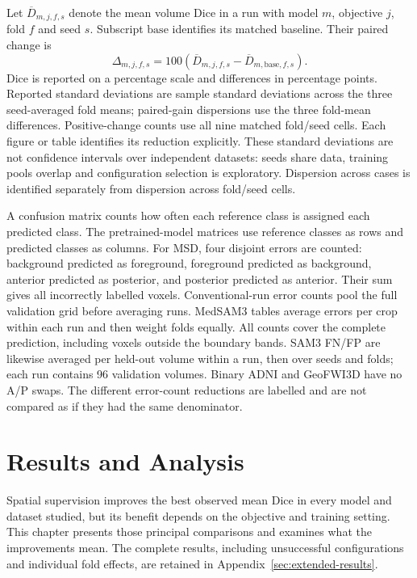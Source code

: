 \documentclass[12pt,a4paper]{article}
\begin{document}
Let $\overline D_{m,j,f,s}$ denote the mean volume Dice in a run with
model $m$, objective $j$, fold $f$ and seed $s$. Subscript
$\mathrm{base}$ identifies its matched baseline. Their paired change is
\begin{equation}
 \Delta_{m,j,f,s}=100\left(
 \overline D_{m,j,f,s}-\overline D_{m,\mathrm{base},f,s}\right).
\label{eq:paired-reported-gain}
\end{equation}
Dice is reported on a percentage scale and differences in percentage
points. Reported standard deviations are sample standard deviations across
the three seed-averaged fold means; paired-gain dispersions use the three
fold-mean differences. Positive-change counts use all nine matched
fold/seed cells. Each figure or table identifies its reduction explicitly.
These standard deviations are not confidence intervals over independent datasets: seeds share data,
training pools overlap and configuration selection is exploratory.
Dispersion across cases is identified separately from dispersion
across fold/seed cells.

A confusion matrix counts how often each reference class is assigned each
predicted class. The pretrained-model matrices use reference classes as rows
and predicted classes as columns. For MSD, four disjoint errors are counted:
background predicted as foreground, foreground predicted as background,
anterior predicted as posterior, and posterior predicted as anterior. Their
sum gives all incorrectly labelled voxels. Conventional-run error counts
pool the full validation grid before averaging runs. MedSAM3 tables average
errors per crop within each run and then weight folds equally. All counts
cover the complete prediction, including voxels outside the boundary bands.
SAM3 FN/FP are likewise averaged per held-out volume within a run, then over
seeds and folds; each run contains 96 validation volumes. Binary ADNI and
GeoFWI3D have no A/P swaps. The different error-count reductions are
labelled and are not compared as if they had the same denominator.

\clearpage

\section{Results and Analysis}
\label{sec:results}

Spatial supervision improves the best observed mean Dice in every model
and dataset studied, but its benefit depends on the objective and training
setting. This chapter presents those principal comparisons and examines
what the improvements mean. The complete results, including unsuccessful
configurations and individual fold effects, are retained in
Appendix~\ref{sec:extended-results}.
\end{document}
